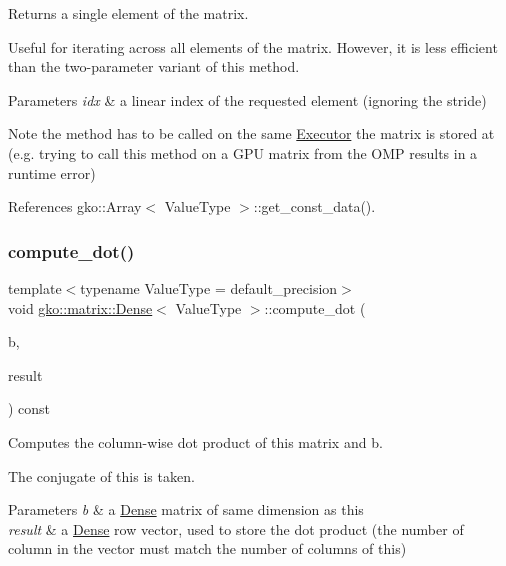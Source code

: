 Returns a single element of the matrix. 

Useful for iterating across all elements of the matrix. However, it is less efficient than the two-\/parameter variant of this method.


\begin{DoxyParams}{Parameters}
{\em idx} & a linear index of the requested element (ignoring the stride)\\
\hline
\end{DoxyParams}
\begin{DoxyNote}{Note}
the method has to be called on the same \hyperlink{classgko_1_1Executor}{Executor} the matrix is stored at (e.\+g. trying to call this method on a G\+PU matrix from the O\+MP results in a runtime error) 
\end{DoxyNote}


References gko\+::\+Array$<$ Value\+Type $>$\+::get\+\_\+const\+\_\+data().

\mbox{\label{classgko_1_1matrix_1_1Dense_acb568ff44addb095b82bbd2fbe704761}} 
\subsubsection{\texorpdfstring{compute\+\_\+dot()}{compute\_dot()}}
{\footnotesize\ttfamily template$<$typename Value\+Type = default\+\_\+precision$>$ \\
void \hyperlink{classgko_1_1matrix_1_1Dense}{gko\+::matrix\+::\+Dense}$<$ Value\+Type $>$\+::compute\+\_\+dot (\begin{DoxyParamCaption}\item[{const \hyperlink{classgko_1_1LinOp}{Lin\+Op} $\ast$}]{b,  }\item[{\hyperlink{classgko_1_1LinOp}{Lin\+Op} $\ast$}]{result }\end{DoxyParamCaption}) const}



Computes the column-\/wise dot product of this matrix and {\ttfamily b}. 

The conjugate of this is taken.


\begin{DoxyParams}{Parameters}
{\em b} & a \hyperlink{classgko_1_1matrix_1_1Dense}{Dense} matrix of same dimension as this \\
\hline
{\em result} & a \hyperlink{classgko_1_1matrix_1_1Dense}{Dense} row vector, used to store the dot product (the number of column in the vector must match the number of columns of this) \\
\hline
\end{DoxyParams}


